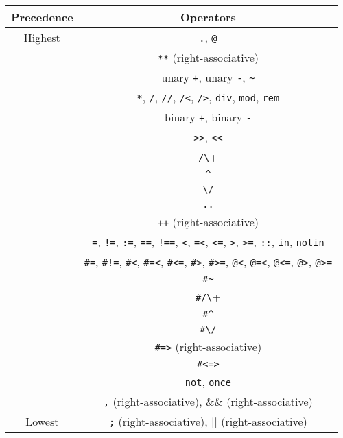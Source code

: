 \begin{center}
\begin{tabular}{ |c|c| } \hline
Precedence & Operators  \\ \hline \hline
Highest    & \verb+.+, \verb+@+ \\ \hline
           & \verb+**+ (right-associative) \\ \hline
           & unary \verb-+-, unary \verb+-+, \verb+~+  \\ \hline 
           & \verb+*+, \verb+/+, \verb+//+, \verb+/<+, \verb+/>+, \verb+div+, \verb+mod+, \verb+rem+ \\ \hline 
           & binary \verb-+-, binary \verb+-+ \\ \hline 
           & \verb+>>+, \verb+<<+ \\ \hline 
           & \verb+/\+ \\ \hline 
           & \verb+^+ \\ \hline 
           & \verb+\/+ \\ \hline 
           & \verb+..+ \\ \hline 
           & \verb-++- (right-associative) \\ \hline 
           &  \verb+=+, \verb+!=+,  \verb+:=+,  \verb+==+, \verb+!==+,  \verb+<+,  \verb+=<+, \verb+<=+, \verb+>+,  \verb+>=+, \verb+::+, \verb+in+, \verb+notin+  \\ 
           &  \verb+#=+,  \verb+#!=+, \verb+#<+,  \verb+#=<+, \verb+#<=+, \verb+#>+, \verb+#>=+, \verb+@<+, \verb+@=<+, \verb+@<=+, \verb+@>+, \verb+@>=+  \\ \hline 
           & \verb+#~+ \\ \hline 
           & \verb+#/\+ \\ \hline 
           & \verb+#^+ \\ \hline 
           & \verb+#\/+ \\ \hline 
           & \verb+#=>+ (right-associative)\\ \hline 
           & \verb+#<=>+ \\ \hline 
           & \verb+not+, \verb+once+  \\ \hline 
           & \verb+,+ (right-associative), $\&\&$ (right-associative) \\ \hline 
Lowest     & \verb+;+ (right-associative), $|$$|$ (right-associative) \\ \hline 
\end{tabular}
\end{center}

